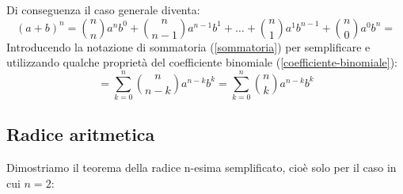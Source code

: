 Di conseguenza il caso generale diventa:
\begin{equation*}
    (a+b)^n = \binom{n}{n} a^n b^0 + \binom{n}{n-1} a^{n-1} b^1 + \dots + \binom{n}{1} a^1b^{n-1} + \binom{n}{0} a^0b^n = 
\end{equation*}
Introducendo la notazione di sommatoria (\ref{sommatoria}) per semplificare e utilizzando qualche proprietà del coefficiente binomiale (\ref{coefficiente-binomiale}):
\begin{equation*}
    = \sum \limits_{k = 0}^{n} \binom{n}{n-k} a^{n-k}b^k = \sum \limits_{k = 0}^{n} \binom{n}{k} a^{n-k}b^k
\end{equation*}


\subsection{Radice aritmetica} \label{RadiceAritmetica}
Dimostriamo il teorema della radice n-esima semplificato, cioè solo per il caso in cui $n = 2$:


